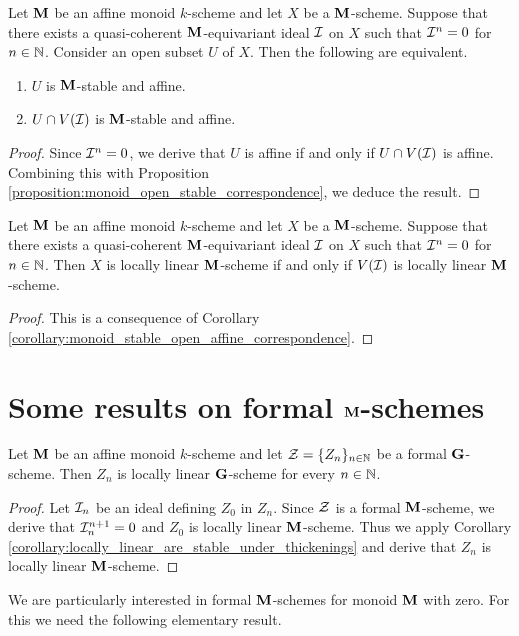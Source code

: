 \begin{corollary}\label{corollary:monoid_stable_open_affine_correspondence}
Let $\mathbf{M}$ be an affine monoid $k$-scheme and let $X$ be a $\mathbf{M}$-scheme. Suppose that there exists a quasi-coherent $\mathbf{M}$-equivariant ideal ${\mathcal I}$ on $X$ such that ${\mathcal I}^n = 0$ for $n\in {\mathbb N}$. Consider an open subset $U$ of $X$. Then the following are equivalent.
\begin{enumerate}[label=\emph{\textbf{(\arabic*)}}, leftmargin=1.5em]
\item $U$ is $\mathbf{M}$-stable and affine.
\item $U\cap V({\mathcal I})$ is $\mathbf{M}$-stable and affine.
\end{enumerate}
\end{corollary}
\begin{proof}
Since ${\mathcal I}^n = 0$, we derive that $U$ is affine if and only if $U\cap V({\mathcal I})$ is affine. Combining this with Proposition \ref{proposition:monoid_open_stable_correspondence}, we deduce the result.
\end{proof}

\begin{corollary}\label{corollary:locally_linear_are_stable_under_thickenings}
Let $\mathbf{M}$ be an affine monoid $k$-scheme and let $X$ be a $\mathbf{M}$-scheme. Suppose that there exists a quasi-coherent $\mathbf{M}$-equivariant ideal ${\mathcal I}$ on $X$ such that ${\mathcal I}^n = 0$ for $n\in {\mathbb N}$. Then $X$ is locally linear $\mathbf{M}$-scheme if and only if $V({\mathcal I})$ is locally linear $\mathbf{M}$-scheme.
\end{corollary}
\begin{proof}
This is a consequence of Corollary \ref{corollary:monoid_stable_open_affine_correspondence}.
\end{proof}

\section{Some results on formal $\mathbf{M}$-schemes}

\begin{corollary}\label{corollary:each_formal_scheme_consists_of_locally_linear_schemes_if_group_is_affine}
Let $\mathbf{M}$ be an affine monoid $k$-scheme and let ${\mathcal Z} = \{Z_n\}_{n\in {\mathbb N}}$ be a formal $\mathbf{G}$-scheme. Then $Z_n$ is locally linear $\mathbf{G}$-scheme for every $n\in {\mathbb N}$.
\end{corollary}
\begin{proof}
Let ${\mathcal I}_n$ be an ideal defining $Z_0$ in $Z_n$. Since ${\mathcal Z}$ is a formal $\mathbf{M}$-scheme, we derive that ${\mathcal I}_n^{n+1} = 0$ and $Z_0$ is locally linear $\mathbf{M}$-scheme. Thus we apply Corollary \ref{corollary:locally_linear_are_stable_under_thickenings} and derive that $Z_n$ is locally linear $\mathbf{M}$-scheme.
\end{proof}
\noindent
We are particularly interested in formal $\mathbf{M}$-schemes for monoid $\mathbf{M}$ with zero. For this we need the following elementary result.

